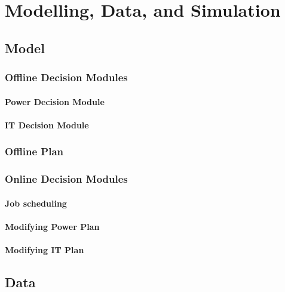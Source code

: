 \chapter{Modelling, Data, and Simulation}
\label{cha:model}

\minitoc

\section{Model}

\subsection{Offline Decision Modules}

\subsubsection{Power Decision Module}

\subsubsection{IT Decision Module}

\subsection{Offline Plan}

\subsection{Online Decision Modules}

\subsubsection{Job scheduling}

\subsubsection{Modifying Power Plan}

\subsubsection{Modifying IT Plan}

\section{Data}

